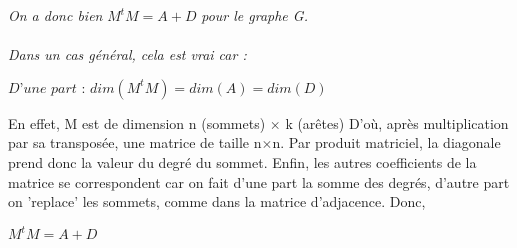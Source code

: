 \documentclass{article}
\begin{document}
	\textit{On a donc bien }$ M^tM = A+D $\textit{ pour le graphe G.}\\\\
	\textit{Dans un cas général, cela est vrai car :}
\begin{center}
	$
	\textit{D'une part : }dim(M^tM) = dim(A) = dim(D)
	$
\end{center}
	\textsf{En effet, M est de dimension n (sommets)} $\times$ \textsf{k (arêtes)}
	\linebreak
	\textsf{D'où, après multiplication par sa transposée, une matrice de taille n}$\times$\textsf{n.}
	\linebreak
	\textsf{Par produit matriciel, la diagonale prend donc la valeur du degré du sommet.}
	\linebreak
	\textsf{Enfin, les autres coefficients de la matrice se correspondent car on fait d'une part la somme des degrés, d'autre part on 'replace' les sommets, comme dans la matrice d'adjacence.}
	\linebreak
	\textsf{Donc,}
	\linebreak
\begin{center}
	$
	M^tM = A + D
	$
\end{center}
\end{document}
